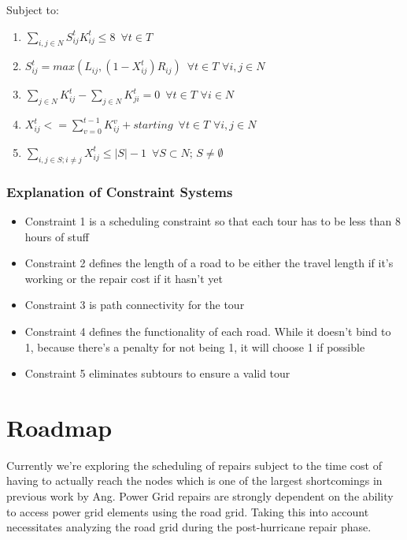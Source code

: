 \documentclass{article}
\begin{document}
	Subject to:
	\begin{enumerate}[label=(\arabic*), leftmargin=*, itemsep=0.4ex, before={\everymath{\displaystyle}}]%
		\item $\sum_{i,j \in N} S_{ij}^t K_{ij}^t \leq 8 \hspace{6pt} \forall t\in T$
		\item $S_{ij}^t = max(L_{ij},(1-X_{ij}^t)R_{ij}) \hspace{6pt} \forall t\in T \hspace{4pt} \forall i,j \in N$
		\item $\sum_{j \in N} K_{ij}^t - \sum_{j \in N} K_{ji}^t = 0 \hspace{6pt} \forall t\in T \hspace{4pt} \forall i \in N$
		\item $X_{ij}^t <= \sum_{v=0}^{t-1} K_{ij}^v + starting \hspace{6pt} \forall t\in T \hspace{4pt} \forall i,j \in N$
		\item $\sum_{i,j \in S; i\neq j} X_{ij}^t \leq |S|-1 \hspace{6pt} \forall S \subset N; \hspace{2pt} S \neq \emptyset$
	\end{enumerate}
	\subsubsection{Explanation of Constraint Systems}
	\begin{itemize}
		\item Constraint 1 is a scheduling constraint so that each tour has to be less than 8 hours of stuff
		\item Constraint 2 defines the length of a road to be either the travel length if it's working or the repair cost if it hasn't yet
		\item Constraint 3 is path connectivity for the tour
		\item Constraint 4 defines the functionality of each road. While it doesn't bind to 1, because there's a penalty for not being 1, it will choose 1 if possible
		\item Constraint 5 eliminates subtours to ensure a valid tour
	\end{itemize}

	\section{Roadmap}
	Currently we're exploring the scheduling of repairs subject to the time cost of having to actually reach the nodes which is one of the largest shortcomings in previous work by Ang\cite{NPSMasters}. Power Grid repairs are strongly dependent on the ability to access power grid elements using the road grid. Taking this into account necessitates analyzing the road grid during the post-hurricane repair phase.
	
\end{document}

